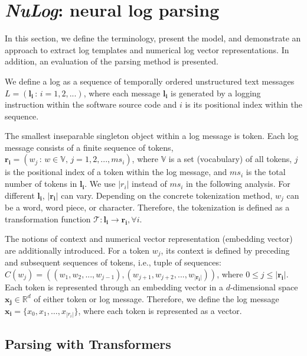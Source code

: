 \section{\textit{NuLog}: neural log parsing}\label{methodology}
In this section, we define the terminology, present the model, and demonstrate an approach to extract log templates and numerical log vector representations. In addition, an evaluation of the parsing method is presented.

We define a log as a sequence of temporally ordered unstructured text messages $L=(\mathbf{l_{i}} \,:\,i=1,2,...)$, where each message $\mathbf{l_{i}}$ is generated by a logging instruction within the software source code and $i$ is its positional index within the sequence. 

The smallest inseparable singleton object within a log message is token. Each log message consists of a finite sequence of tokens, $\mathbf{r_i}=(w_{j}\,:\,w \in  \mathbb{V},\,j=1,2,..., ms_i)$, where $ \mathbb{V}$ is a set (vocabulary) of all tokens, $j$ is the positional index of a token within the log message, and $ms_i$ is the total number of tokens in $\mathbf{l_i}$. We use $\vert r_i \vert$ instead of $ms_i$ in the following analysis. For different $\mathbf{l_i}$, $\vert \mathbf{r_i} \vert$ can vary. Depending on the concrete tokenization method, $w_j$ can be a word, word piece, or character. Therefore, the tokenization is defined as a transformation function $\mathcal{T}: \mathbf{l_i} \to \mathbf{r_i}, \forall i$.

The notions of context and numerical vector representation (embedding vector) are additionally introduced. For a token $w_j$, its context is defined by preceding and subsequent sequences of tokens, i.e., tuple of sequences: $C(w_j)=((w_{1}, w_{2},...,w_{j-1}), \allowbreak (w_{j+1}, w_{j+2},...,w_{\vert \mathbf{r_i} \vert}))$, where $0 \leq j \leq \vert \mathbf{r_i} \vert$. Each token is represented through an embedding vector in a $d$-dimensional space $\mathbf{x_j} \in \mathbb{R}^{d}$ of either token or log message. Therefore, we define the log message $\mathbf{x_i}=\{x_0,x_1,\dots,x_{|r_i|}\}$, where each token is represented as a vector.

\subsection{Parsing with Transformers}\label{NuLog}

